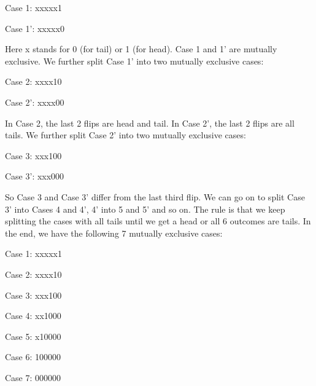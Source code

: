 \documentclass[11pt]{article}
\begin{document}
Case 1: xxxxx1 

Case 1': xxxxx0

Here x stands for 0 (for tail) or 1 (for head). Case 1 and 1' are mutually exclusive. We further split 
Case 1' into two mutually exclusive cases: 

Case 2: xxxx10 

Case 2': xxxx00 

In Case 2, the last 2 flips are head and tail. In Case 2', the last 2 flips are all tails. We further 
split Case 2' into two mutually exclusive cases:

Case 3: xxx100

Case 3': xxx000

So Case 3 and Case 3' differ from the last third flip. We can go on to split Case 3' into Cases 4 and 4', 4' into 
5 and 5' and so on. The rule is that we keep splitting the cases with all tails until we get a head or all 6 
outcomes are tails. In the end, we have the following 7 mutually exclusive cases: 

Case 1: xxxxx1

Case 2: xxxx10

Case 3: xxx100

Case 4: xx1000

Case 5: x10000

Case 6: 100000

Case 7: 000000
\end{document}
